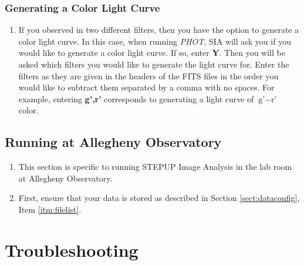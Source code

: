 \documentclass[11pt]{report}
\begin{document}
\subsection{Generating a Color Light Curve}
\begin{enumerate}
\item If you observed in two different filters, then you have the option to generate a color light curve. In this case, when running \emph{PHOT}, SIA will ask you if you would like to generate a color light curve. If so, enter {\bf Y}. Then you will be asked which filters you would like to generate the light curve for. Enter the filters as they are given in the headers of the FITS files in the order you would like to subtract them separated by a comma with no spaces. For example, entering {\bf g',r'} corresponds to generating a light curve of $\textrm{g'}-\textrm{r'}$ color.
\end{enumerate}


\section{Running at Allegheny Observatory}

\begin{enumerate}
\item This section is specific to running STEPUP Image Analysis in the lab room at Allegheny Observatory. 
\item First, ensure that your data is stored as described in Section \ref{sect:dataconfig}, Item \ref{itm:filelist}.
\end{enumerate}




\chapter{Troubleshooting}
\end{document}
